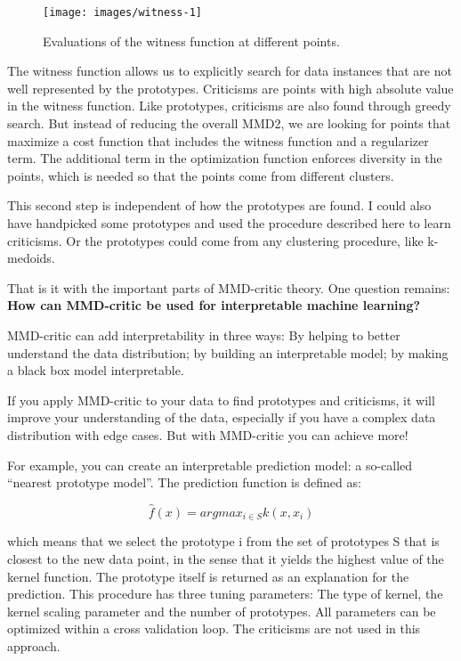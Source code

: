\documentclass[
  12pt,
]{krantz}
\begin{document}
\begin{figure}

{\centering \texttt{[image: images/witness-1]} 

}

\caption{Evaluations of the witness function at different points.}\label{fig:witness}
\end{figure}

The witness function allows us to explicitly search for data instances that are not well represented by the prototypes.
Criticisms are points with high absolute value in the witness function.
Like prototypes, criticisms are also found through greedy search.
But instead of reducing the overall MMD2, we are looking for points that maximize a cost function that includes the witness function and a regularizer term.
The additional term in the optimization function enforces diversity in the points, which is needed so that the points come from different clusters.

This second step is independent of how the prototypes are found.
I could also have handpicked some prototypes and used the procedure described here to learn criticisms.
Or the prototypes could come from any clustering procedure, like k-medoids.

That is it with the important parts of MMD-critic theory.
One question remains:
\textbf{How can MMD-critic be used for interpretable machine learning?}

MMD-critic can add interpretability in three ways:
By helping to better understand the data distribution;
by building an interpretable model;
by making a black box model interpretable.

If you apply MMD-critic to your data to find prototypes and criticisms, it will improve your understanding of the data, especially if you have a complex data distribution with edge cases.
But with MMD-critic you can achieve more!

For example, you can create an interpretable prediction model: a so-called ``nearest prototype model''.
The prediction function is defined as:

\[\hat{f}(x)=argmax_{i\in{}S}k(x,x_i)\]

which means that we select the prototype i from the set of prototypes S that is closest to the new data point, in the sense that it yields the highest value of the kernel function.
The prototype itself is returned as an explanation for the prediction.
This procedure has three tuning parameters:
The type of kernel, the kernel scaling parameter and the number of prototypes.
All parameters can be optimized within a cross validation loop.
The criticisms are not used in this approach.
\end{document}
